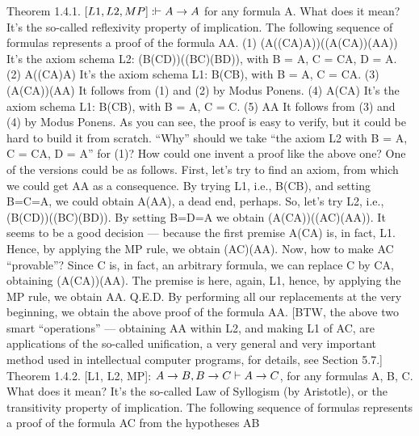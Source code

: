 Theorem 1.4.1. \([L1, L2, MP]: \vdash A\rightarrow A\) for any formula A. What does it mean? It's the so-called
reflexivity property of implication.
The following sequence of formulas represents a proof of the formula A\IMPLIES A.
(1) (A\IMPLIES ((C\IMPLIES A)\IMPLIES A))\IMPLIES ((A\IMPLIES (C\IMPLIES A))\IMPLIES (A\IMPLIES A)) It's the axiom schema L2: (B\IMPLIES (C\IMPLIES D))\IMPLIES ((B\IMPLIES C)\IMPLIES (B\IMPLIES D)), with B = A, C = C\IMPLIES A, D = A.  (2) A\IMPLIES ((C\IMPLIES A)\IMPLIES A) It's the axiom schema L1: B\IMPLIES (C\IMPLIES B), with B = A, C = C\IMPLIES A.  (3) (A\IMPLIES (C\IMPLIES A))\IMPLIES (A\IMPLIES A) It follows from (1) and (2) by Modus Ponens.  (4) A\IMPLIES (C\IMPLIES A) It's the axiom schema L1: B\IMPLIES (C\IMPLIES B), with B = A, C = C.  (5) A\IMPLIES A It follows from (3) and (4) by Modus Ponens.
As you can see, the proof is easy to verify, but it could be hard to build it from scratch. ``Why'' should we
take ``the axiom L2 with B = A, C = C\IMPLIES A, D = A'' for (1)?
How could one invent a proof like the above one? One of the versions could be as follows. First, let's try to find an axiom,
from which we could get A\IMPLIES A as a consequence. By trying L1, i.e., B\IMPLIES (C\IMPLIES B), and setting B=C=A, we could obtain
A\IMPLIES (A\IMPLIES A), a dead end, perhaps. So, let's try L2, i.e., (B\IMPLIES (C\IMPLIES D))\IMPLIES ((B\IMPLIES C)\IMPLIES (B\IMPLIES D)). By setting B=D=A we obtain
(A\IMPLIES (C\IMPLIES A))\IMPLIES ((A\IMPLIES C)\IMPLIES (A\IMPLIES A)). It seems to be a good decision --- because the first premise A\IMPLIES (C\IMPLIES A) is, in fact, L1.
Hence, by applying the MP rule, we obtain (A\IMPLIES C)\IMPLIES (A\IMPLIES A). Now, how to make A\IMPLIES C ``provable''? Since C is, in fact, an
arbitrary formula, we can replace C by C\IMPLIES A, obtaining (A\IMPLIES (C\IMPLIES A))\IMPLIES (A\IMPLIES A). The premise is here, again, L1, hence, by
applying the MP rule, we obtain A\IMPLIES A. Q.E.D. By performing all our replacements at the very beginning, we obtain the above
proof of the formula A\IMPLIES A. [BTW, the above two smart ``operations'' --- obtaining A\IMPLIES A within L2, and making L1 of A\IMPLIES C,
are applications of the so-called unification, a very general and very important method used in intellectual computer programs,
for details, see Section 5.7.]
Theorem 1.4.2. [L1, L2, MP]: \(A\rightarrow B, B\rightarrow C \vdash A\rightarrow C\), for any formulas A, B, C. What does it mean? It's
the so-called Law of Syllogism (by Aristotle), or the transitivity property of implication.
The following sequence of formulas represents a proof of the formula A\IMPLIES C from the hypotheses A\IMPLIES B
